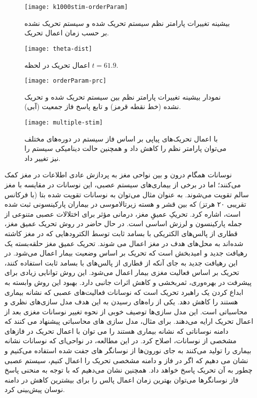\begin{figure}
	\centering
	\texttt{[image: k1000stim-orderParam]}
    \caption{
بیشینه تغییرات پارامتر نظم سیستم تحریک شده و سیستم تحریک نشده بر حسب زمان اعمال تحریک.
    }
\end{figure}




\begin{figure}
	\centering
	\texttt{[image: theta-dist]}
    \caption{
اعمال تحریک در لحظه 
$t=61.9$.
    }
\end{figure}



\begin{figure}
	\centering
	\texttt{[image: orderParam-prc]}
    \caption{
نمودار بیشینه تغییرات پارامتر نظم بین سیستم تحریک شده و تحریک نشده (خط نقطه قرمز) و تابع پاسخ فاز جمعیت (آبی).
    }
\end{figure}

\begin{figure}
	\centering
	\texttt{[image: multiple-stim]}
    \caption{
با اعمال تحریک‌های پیاپی بر اساس فاز سیستم در دوره‌های مختلف می‌توان پارامتر نظم را کاهش داد و همچنین حالت دینامیکی سیستم را نیز تغییر داد.
    }
\end{figure}

نوسانات همگام درون و بین نواحی مغز به پردازش عادی اطلاعات در مغز کمک می‌کنند؛ اما در برخی از بیماری‌های سیستم عصبی، این نوسانات در مقایسه با مغز سالم تقویت می‌شوند. به عنوان مثال می‌توان به نوسانات تقویت شده بتا (با فرکانس تقریبی ۲۰ هرتز) که بین قشر و هسته زیرتالاموسی در بیماران پارکینسونی ثبت شده است، اشاره کرد. تحریکِ عمیقِ مغز، درمانی مؤثر برای اختلالات عصبی متنوعی از جمله پارکینسون و لرزش اساسی است. در حال حاضر در روش تحریک عمیق مغز، قطاری از پالس‌های الکتریکی با بسامد ثابت توسط الکترود‌هایی که در مغز کاشته شده‌اند به محل‌های هدف در مغز اعمال می شوند.  تحریک عمیق مغز حلقه‌بسته یک رهیافت جدید و  امید‌بخش است که تحریک بر اساس وضعیت بیمار اعمال می‌شود. در این رهیافت جدید به جای آنکه از قطاری از پالس‌های با بسامد ثابت استفاده کنند، تحریک بر اساس فعالیت مغزی بیمار اعمال می‌شود.  این روش توانایی زیادی برای پیشرفت در بهره‌وری، ثمربخشی و کاهش اثرات جانبی دارد. بهبود این روش وابسته به ابداع کردن یک راهبرد تحریک است که نوسانات فعالیت‌های عصبی که نشانه بیماری هستند را کاهش دهد. یکی از راه‌های رسیدن به این هدف مدل سازی‌های نظری و محاسباتی است. این مدل سازی‌ها توصیف خوبی از نحوه تغییر نوسانات مغزی بعد از اعمال تحریک ارایه می‌دهند. برای مثال، مدل سازی های محاسباتی پیشنهاد می کنند که دامنه نوساناتی که نشانه بیماری هستند را می توان با اعمال تحریک در فازهای مشخصی از نوسانات، اصلاح کرد. در این مطالعه، در نواحی‌ای که نوسانات نشانه بیماری را تولید می‌کنند به جای نورون‌ها از نوسانگر های جفت شده استفاده می‌کنیم و نشان می دهیم که اگر در فاز و دامنه مشخصی تحریک را اعمال کنیم، سیستم عصبی چطور به آن تحریک پاسخ خواهد داد. همچنین نشان می‌دهیم که با توجه به منحنی پاسخ فاز نوسانگرها می‌توان بهترین زمان اعمال پالس را برای بیشترین کاهش در دامنه نوسان پیش‌بینی کرد.
